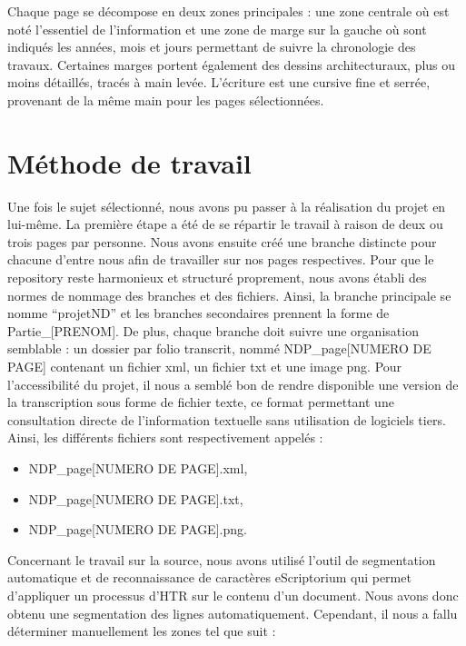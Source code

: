 \documentclass{article}
\begin{document}
Chaque page se décompose en deux zones principales : une zone centrale où est noté l’essentiel de l’information et une zone de marge sur la gauche où sont indiqués les années, mois et jours permettant de suivre la chronologie des travaux. Certaines marges portent également des dessins architecturaux, plus ou moins détaillés, tracés à main levée. L’écriture est une cursive fine et serrée, provenant de la même main pour les pages sélectionnées.


\section{Méthode de travail}


Une fois le sujet sélectionné, nous avons pu passer à la réalisation du projet en lui-même. La première étape a été de se répartir le travail à raison de deux ou trois pages par personne. Nous avons ensuite créé une branche distincte pour chacune d’entre nous afin de travailler sur nos pages respectives. Pour que le repository reste harmonieux et structuré proprement, nous avons établi des normes de nommage des branches et des fichiers. Ainsi, la branche principale se nomme “projetND” et les branches secondaires prennent la forme de Partie\_[PRENOM]. 
De plus, chaque branche doit suivre une organisation semblable : un dossier par folio transcrit, nommé NDP\_page[NUMERO DE PAGE] contenant un fichier xml, un fichier txt et une image png. Pour l’accessibilité du projet, il nous a semblé bon de rendre disponible une version de la transcription sous forme de fichier texte, ce format permettant une consultation directe de l’information textuelle sans utilisation de logiciels tiers. Ainsi, les différents fichiers sont respectivement appelés : 

\begin{itemize}
\item NDP\_page[NUMERO DE PAGE].xml, 
\item NDP\_page[NUMERO DE PAGE].txt, 
\item NDP\_page[NUMERO DE PAGE].png.

\end{itemize}

Concernant le travail sur la source, nous avons utilisé l’outil de segmentation automatique et de reconnaissance de caractères eScriptorium qui permet d’appliquer un processus d’HTR sur le contenu d’un document. Nous avons donc obtenu une segmentation des lignes automatiquement. Cependant, il nous a fallu déterminer manuellement les zones tel que suit : 
\end{document}
